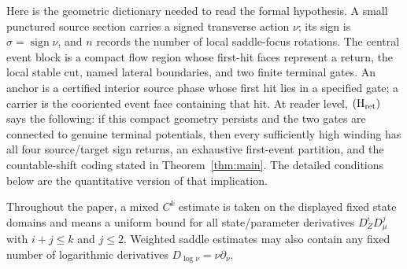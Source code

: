 \documentclass[11pt,reqno]{amsart}
\numberwithin{equation}{section}
\theoremstyle{definition}
\theoremstyle{remark}
\begin{document}
Here is the geometric dictionary needed to read the formal hypothesis.  A
small punctured source section carries a signed transverse action $\nu$; its
sign is $\sigma=\operatorname{sign}\nu$, and $n$ records the number of local
saddle-focus rotations.  The central event block is a compact flow region
whose first-hit faces represent a return, the local stable cut, named lateral
boundaries, and two finite terminal gates.  An anchor is a certified interior
source phase whose first hit lies in a specified gate; a carrier is the
cooriented event face containing that hit.  At reader level,
${\rm(H_{ret})}$ says the following: if this compact geometry persists and
the two gates are connected to genuine terminal potentials, then every
sufficiently high winding has all four source/target sign returns, an
exhaustive first-event partition, and the countable-shift coding stated in
Theorem~\ref{thm:main}.  The detailed conditions below are the quantitative
version of that implication.

Throughout the paper, a mixed $C^k$ estimate is taken on the displayed fixed
state domains and means a uniform bound for all state/parameter derivatives
$D_Z^iD_\mu^j$ with $i+j\le k$ and $j\le2$.  Weighted saddle estimates may
also contain any fixed number of logarithmic derivatives
$D_{\log\nu}=\nu\partial_\nu$.
\end{document}
